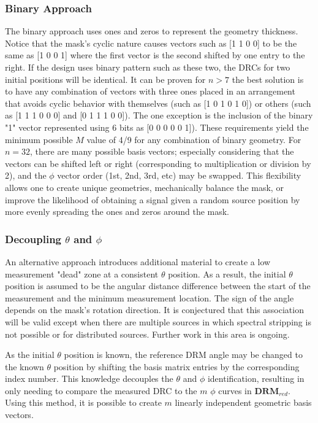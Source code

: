 \documentclass[3p,times]{elsarticle}
\begin{document}
\subsubsection{Binary Approach}
The binary approach uses ones and zeros to represent the geometry thickness.  
Notice that the mask's cyclic nature causes vectors such as [1 1 0 0] to be the same as [1 0 0 1] where the first vector is the second shifted by one entry to the right.  
If the design uses binary pattern such as these two, the DRCs for two initial positions will be identical.  
It can be proven for $n>7$ the best solution is to have any combination of vectors with three ones placed in an arrangement that avoids cyclic behavior with themselves (such as [1 0 1 0 1 0]) or others (such as [1 1 1 0 0 0] and [0 1 1 1 0 0]).  
The one exception is the inclusion of the binary "1" vector represented using 6 bits as [0 0 0 0 0 1]).  
These requirements yield the minimum possible $M$ value of 4/9 for any combination of binary geometry.  
For $n=32$, there are many possible basis vectors; especially considering that the vectors can be shifted left or right (corresponding to multiplication or division by 2), and the $\phi$ vector order (1st, 2nd, 3rd, etc) may be swapped.  
This flexibility allows one to create unique geometries, mechanically balance the mask, or improve the likelihood of obtaining a signal given a random source position by more evenly spreading the ones and zeros around the mask.

\subsubsection{Decoupling $\theta$ and $\phi$}
An alternative approach introduces additional material to create a low measurement "dead" zone at a consistent $\theta$ position.  
As a result, the initial $\theta$ position is assumed to be the angular distance difference between the start of the measurement and the minimum measurement location.  
The sign of the angle depends on the mask's rotation direction.  
It is conjectured that this association will be valid except when there are multiple sources in which spectral stripping is not possible  or for distributed sources.  
Further work in this area is ongoing.

As the initial $\theta$ position is known, the reference DRM angle may be changed to the known $\theta$ position by shifting the basis matrix entries by the corresponding index number.
This knowledge decouples the $\theta$ and $\phi$ identification, resulting in only  needing to compare the measured DRC to the $m$ $\phi$ curves in $\mathbf{DRM}_{red}$.  
Using this method, it is possible to create $m$ linearly independent geometric basis vectors.
\end{document}
